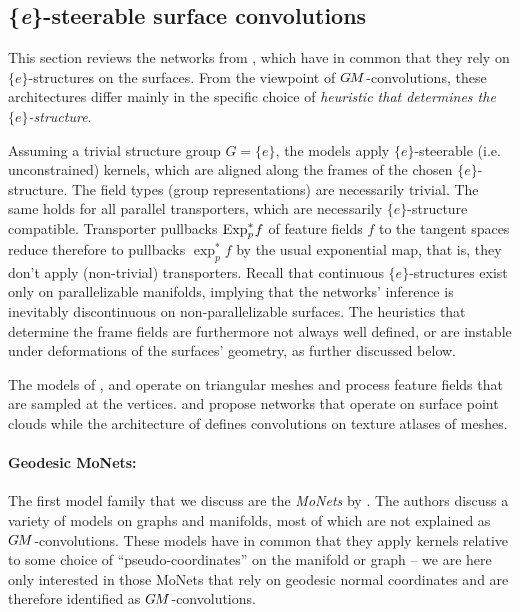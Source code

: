 

\subsection{\{\textit{e}\}-steerable surface convolutions}
\label{sec:e_surface_conv}


This section reviews the networks from 
\cite{monti2017geometric,jin2018learning,schonsheck2018parallel,tatarchenko2018tangent,jin2019NPTCnet,li2019crossAtlas},
which have in common that they rely on $\{e\}$-structures on the surfaces.
From the viewpoint of $G\mkern-1.4muM$-convolutions, these architectures differ mainly in the specific choice of \emph{heuristic that determines the $\{e\}$-structure}.


Assuming a trivial structure group $G=\{e\}$, the models apply $\{e\}$-steerable (i.e. unconstrained) kernels, which are aligned along the frames of the chosen $\{e\}$-structure.
The field types (group representations) are necessarily trivial.
The same holds for all parallel transporters, which are necessarily $\{e\}$-structure compatible.
Transporter pullbacks $\operatorname{Exp}^*_p\mkern-2mu f$ of feature fields $f$ to the tangent spaces reduce therefore to pullbacks $\exp_p^*f$ by the usual exponential map, that is, they don't apply (non-trivial) transporters.
Recall that continuous $\{e\}$-structures exist only on parallelizable manifolds, implying that the networks' inference is inevitably discontinuous on non-parallelizable surfaces.
The heuristics that determine the frame fields are furthermore not always well defined, or are instable under deformations of the surfaces' geometry, as further discussed below.

The models of \citet{monti2017geometric}, \citet{jin2018learning} and \citet{schonsheck2018parallel} operate on triangular meshes and process feature fields that are sampled at the vertices.
\citet{tatarchenko2018tangent} and \citet{jin2019NPTCnet} propose networks that operate on surface point clouds while the architecture of \citet{li2019crossAtlas} defines convolutions on texture atlases of meshes.





\paragraph{Geodesic MoNets:}
The first model family that we discuss are the \emph{MoNets} by \citet{monti2017geometric}.
The authors discuss a variety of models on graphs and manifolds, most of which are not explained as $G\mkern-1.4muM$-convolutions.
These models have in common that they apply kernels relative to some choice of ``pseudo-coordinates'' on the manifold or graph
-- we are here only interested in those MoNets that rely on geodesic normal coordinates and are therefore identified as $G\mkern-1.4muM$-convolutions.

